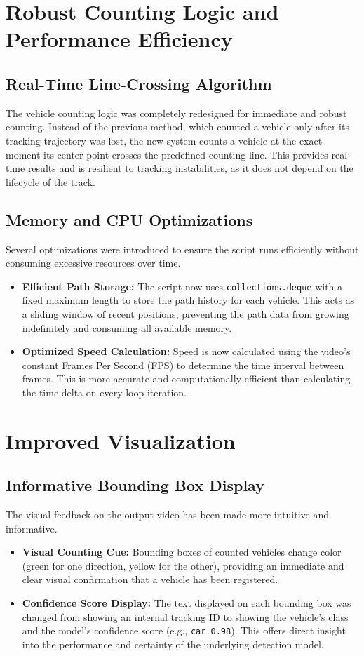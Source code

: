 \documentclass{article}
\begin{document}
\section{Robust Counting Logic and Performance Efficiency}

\subsection{Real-Time Line-Crossing Algorithm}
The vehicle counting logic was completely redesigned for immediate and robust counting. Instead of the previous method, which counted a vehicle only after its tracking trajectory was lost, the new system counts a vehicle at the exact moment its center point crosses the predefined counting line. This provides real-time results and is resilient to tracking instabilities, as it does not depend on the lifecycle of the track.

\subsection{Memory and CPU Optimizations}
Several optimizations were introduced to ensure the script runs efficiently without consuming excessive resources over time.
\begin{itemize}
    \item \textbf{Efficient Path Storage:} The script now uses \texttt{collections.deque} with a fixed maximum length to store the path history for each vehicle. This acts as a sliding window of recent positions, preventing the path data from growing indefinitely and consuming all available memory.
    \item \textbf{Optimized Speed Calculation:} Speed is now calculated using the video's constant Frames Per Second (FPS) to determine the time interval between frames. This is more accurate and computationally efficient than calculating the time delta on every loop iteration.
\end{itemize}

\section{Improved Visualization}

\subsection{Informative Bounding Box Display}
The visual feedback on the output video has been made more intuitive and informative.
\begin{itemize}
    \item \textbf{Visual Counting Cue:} Bounding boxes of counted vehicles change color (green for one direction, yellow for the other), providing an immediate and clear visual confirmation that a vehicle has been registered.
    \item \textbf{Confidence Score Display:} The text displayed on each bounding box was changed from showing an internal tracking ID to showing the vehicle's class and the model's confidence score (e.g., \texttt{car 0.98}). This offers direct insight into the performance and certainty of the underlying detection model.
\end{itemize}
\end{document}
